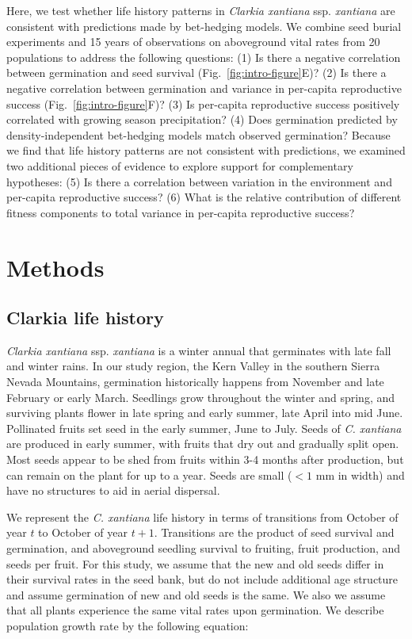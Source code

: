 \documentclass[12pt, oneside, titlepage]{article}   	%
\begin{document}
Here, we test whether life history patterns in \textit{Clarkia xantiana} ssp. \textit{xantiana} are consistent with predictions made by bet-hedging models. We combine seed burial experiments and 15 years of observations on aboveground vital rates from 20 populations to address the following questions: (1) Is there a negative correlation between germination and seed survival (Fig.~\ref{fig:intro-figure}E)? (2) Is there a negative correlation between germination and variance in per-capita reproductive success (Fig.~\ref{fig:intro-figure}F)? (3) Is per-capita reproductive success positively correlated with growing season precipitation? (4) Does germination predicted by density-independent bet-hedging models match observed germination? Because we find that life history patterns are not consistent with predictions, we examined two additional pieces of evidence to explore support for complementary hypotheses: (5) Is there a correlation between variation in the environment and per-capita reproductive success? (6) What is the relative contribution of different fitness components to total variance in per-capita reproductive success?

\section{Methods}

\subsection{Clarkia life history}

\textit{Clarkia xantiana} ssp. \textit{xantiana} is a winter annual that germinates with late fall and winter rains. In our study region, the Kern Valley in the southern Sierra Nevada Mountains, germination historically happens from November and late February or early March. Seedlings grow throughout the winter and spring, and surviving plants flower in late spring and early summer, late April into mid June. Pollinated fruits set seed in the early summer, June to July. Seeds of \textit{C. xantiana} are produced in early summer, with fruits that dry out and gradually split open. Most seeds appear to be shed from fruits within 3-4 months after production, but can remain on the plant for up to a year. Seeds are small ($<1$ mm in width) and have no structures to aid in aerial dispersal. 

We represent the \textit{C. xantiana} life history in terms of transitions from October of year $t$ to October of year $t+1$. Transitions are the product of seed survival and germination, and aboveground seedling survival to fruiting, fruit production, and seeds per fruit. For this study, we assume that the new and old seeds differ in their survival rates in the seed bank, but do not include additional age structure and assume germination of new and old seeds is the same. We also we assume that all plants experience the same vital rates upon germination. We describe population growth rate by the following equation:
\end{document}
